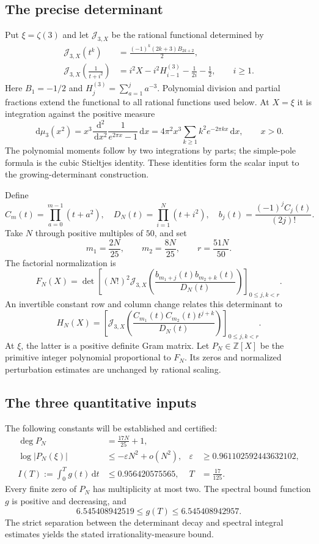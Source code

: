 \documentclass[11pt]{article}
\theoremstyle{definition}\newtheorem{definition}[theorem]{Definition}
\theoremstyle{remark}\newtheorem{remark}[theorem]{Remark}
\newcommand{\dd}{\,\mathrm d}
\begin{document}
\subsection{The precise determinant}
Put $\xi=\zeta(3)$ and let $\mathcal J_{3,X}$ be the rational functional determined by
\begin{align}
 \mathcal J_{3,X}(t^k)&=\frac{(-1)^k(2k+3)B_{2k+2}}2,\label{eq:moments}\\
 \mathcal J_{3,X}\!\left(\frac1{t+i^2}\right)
 &=i^2X-i^2H_{i-1}^{(3)}-\frac1{2i}-\frac12,
 \qquad i\ge1.\label{eq:poles}
\end{align}
Here $B_1=-1/2$ and $H_j^{(3)}=\sum_{a=1}^j a^{-3}$. Polynomial division and partial fractions extend the functional to all rational functions used below. At $X=\xi$ it is integration against the positive measure
\[
 \dd\mu_3(x^2)=x^3\frac{\dd^2}{\dd x^2}
                  \frac1{e^{2\pi x}-1}\dd x
 =4\pi^2x^3\sum_{k\ge1}k^2e^{-2\pi kx}\dd x,
 \qquad x>0.
\]
The polynomial moments follow by two integrations by parts; the simple-pole formula is the cubic Stieltjes identity. These identities form the scalar input to the growing-determinant construction.

Define
\[
 C_m(t)=\prod_{a=0}^{m-1}(t+a^2),\quad
 D_N(t)=\prod_{i=1}^N(t+i^2),\quad
 b_j(t)=\frac{(-1)^j C_j(t)}{(2j)!}.
\]
Take $N$ through positive multiples of $50$, and set
\[
 m_1=\frac{2N}{25},\qquad m_2=\frac{8N}{25},\qquad r=\frac{51N}{50}.
\]
The factorial normalization is
\begin{equation}\label{eq:FN}
 F_N(X)=\det\left[(N!)^2\mathcal J_{3,X}
 \left(\frac{b_{m_1+j}(t)b_{m_2+k}(t)}{D_N(t)}\right)
 \right]_{0\le j,k<r}.
\end{equation}
An invertible constant row and column change relates this determinant to
\begin{equation}\label{eq:Hmain}
 H_N(X)=\left[\mathcal J_{3,X}
 \left(\frac{C_{m_1}(t)C_{m_2}(t)t^{j+k}}{D_N(t)}\right)
 \right]_{0\le j,k<r}.
\end{equation}
At $\xi$, the latter is a positive definite Gram matrix. Let $P_N\in\mathbb Z[X]$ be the primitive integer polynomial proportional to $F_N$. Its zeros and normalized perturbation estimates are unchanged by rational scaling.

\subsection{The three quantitative inputs}
The following constants will be established and certified:
\begin{align}
 \deg P_N&=\frac{17N}{25}+1,\label{eq:degree-main}\\
 \log|P_N(\xi)|&\le-\varepsilon N^2+o(N^2),
 &\varepsilon&\ge0.961102592443632102,\label{eq:small-main}\\
 I(T):=\int_0^T g(t)\dd t&\le0.956420575565,
 &T&=\frac{17}{125}.\label{eq:response-main}
\end{align}
Every finite zero of $P_N$ has multiplicity at most two. The spectral bound function $g$ is positive and decreasing, and
\[
 6.545408942519\le g(T)\le6.545408942957.
\]
The strict separation between the determinant decay and spectral integral estimates yields the stated irrationality-measure bound.
\end{document}

